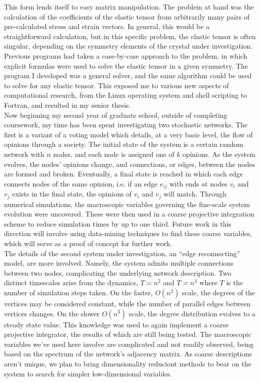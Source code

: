 \documentclass[11pt]{article}
\begin{document}
This form lends itself to easy matrix manipulation. The problem at hand was the calculation of the coefficients of the elastic tensor from arbitrarily many pairs of pre-calculated stress and strain vectors. In general, this would be a straightforward calculation, but in this specific problem, the elastic tensor is often singular, depending on the symmetry elements of the crystal under investigation. Previous programs had taken a case-by-case approach to the problem, in which explicit formulas were used to solve the elastic tensor in a given symmetry. The program I developed was a general solver, and the same algorithm could be used to solve for any elastic tensor. This exposed me to various new aspects of computational research, from the Linux operating system and shell scripting to Fortran, and resulted in my senior thesis.\\

Now beginning my second year of graduate school, outside of completing coursework, my time has been spent investigating two stochastic networks. The first is a variant of a voting model which details, at a very basic level, the flow of opinions through a society. The initial state of the system is a certain random network with $n$ nodes, and each node is assigned one of $k$ opinions. As the system evolves, the nodes' opinions change, and connections, or edges, between the nodes are formed and broken.  Eventually, a final state is reached in which each edge connects nodes of the same opinion, i.e. if an edge $e_{ij}$ with ends at nodes $v_{i}$ and $v_{j}$ exists in the final state, the opinions of $v_{i}$ and $v_{j}$ will match. Through numerical simulations, the macroscopic variables governing the fine-scale system evolution were uncovered. These were then used in a coarse projective integration scheme to reduce simulation times by up to one third. Future work in this direction will involve using data-mining techniques to find these coarse variables, which will serve as a proof of concept for further work.\\

The details of the second system under investigation, an ``edge reconnecting'' model, are more involved. Namely, the system admits multiple connections between two nodes, complicating the underlying network description. Two distinct timescales arise from the dynamics, $T\asymp n^{2}$ and $T\asymp n^{3}$ where $T$ is the number of simulation steps taken. On the faster, $O(n^{2})$ scale, the degrees of the vertices may be considered constant, while the number of parallel edges between vertices changes. On the slower $O(n^{3})$ scale, the degree distribution evolves to a steady state value. This knowledge was used to again implement a coarse projective integrator, the results of which are still being tested. The macroscopic variables we've used here involve are complicated and not readily observed, being based on the spectrum of the network's adjacency matrix. As coarse descriptions aren't unique, we plan to bring dimensionality reduciont methods to bear on the system to search for simpler low-dimensional variables.\\  
\end{document}
